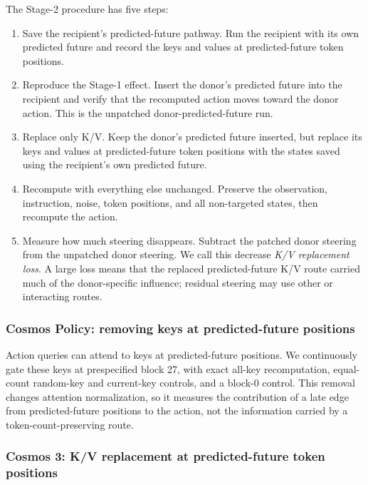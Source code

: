 \documentclass{article}
\begin{document}
The Stage-2 procedure has five steps:
\begin{enumerate}
  \item Save the recipient's predicted-future pathway. Run the recipient with its own predicted future and record the keys and values at predicted-future token positions.
  \item Reproduce the Stage-1 effect. Insert the donor's predicted future into the recipient and verify that the recomputed action moves toward the donor action. This is the unpatched donor-predicted-future run.
  \item Replace only K/V. Keep the donor's predicted future inserted, but replace its keys and values at predicted-future token positions with the states saved using the recipient's own predicted future.
  \item Recompute with everything else unchanged. Preserve the observation, instruction, noise, token positions, and all non-targeted states, then recompute the action.
  \item Measure how much steering disappears. Subtract the patched donor steering from the unpatched donor steering. We call this decrease \emph{K/V replacement loss}. A large loss means that the replaced predicted-future K/V route carried much of the donor-specific influence; residual steering may use other or interacting routes.
\end{enumerate}

\subsubsection{Cosmos Policy: removing keys at predicted-future positions}

Action queries can attend to keys at predicted-future positions. We continuously gate these keys at prespecified block 27, with exact all-key recomputation, equal-count random-key and current-key controls, and a block-0 control. This removal changes attention normalization, so it measures the contribution of a late edge from predicted-future positions to the action, not the information carried by a token-count-preserving route.

\subsubsection{Cosmos 3: K/V replacement at predicted-future token positions}
\end{document}
